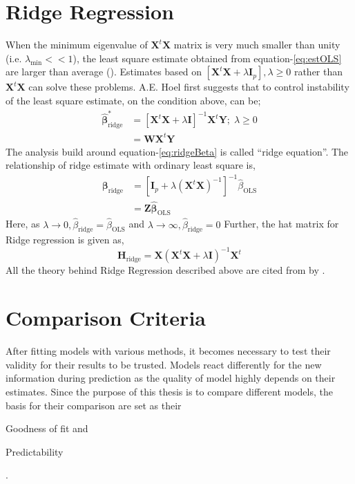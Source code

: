 \documentclass[12pt, lot, lof]{thesis}\usepackage[]{graphicx}\usepackage[]{color}
\newcommand{\bs}[1]{\ensuremath{\boldsymbol{#1}}}
\begin{document}
\section{Ridge Regression}
\label{sec:ridgeRegression}
When the minimum eigenvalue of $\bs{X}^t\bs{X}$ matrix is very much smaller than unity (i.e. $\lambda_\text{min}<<1$), the least square estimate obtained from equation-\ref{eq:estOLS} are larger than average (\cite{marquardt1975ridge}).
Estimates based on $\left[\bs{X}^t\bs{X}+\lambda\bs{I}_p\right], \lambda \ge 0$ rather than $\bs{X}^t\bs{X}$ can solve these problems. A.E. Hoel first suggests that to control instability of the least square estimate, on the condition above, can be;
\begin{align}
\hat{\bs{\beta}}^*_\text{ridge}&=\left[\bs{X}^t\bs{X}+\lambda\bs{I}\right]^{-1}\bs{X}^t\bs{Y};\; \lambda \ge 0 \nonumber\\
&=\bs{WX}^t\bs{Y}
\label{eq:ridgeBeta}
\end{align}
The analysis build around equation-\ref{eq:ridgeBeta} is called ``ridge equation''. The relationship of ridge estimate with ordinary least square is,
\begin{align}
\bs{\beta}_\text{ridge}&=\left[\bs{I}_p+\lambda\left(\bs{X}^t\bs{X}\right)^{-1}\right]^{-1}\hat{\beta}_\text{OLS} \nonumber \\
&=\bs{Z}\hat{\bs{\beta}}_\text{OLS}
\end{align}
Here, as $\lambda \rightarrow 0, \hat{\beta}_\text{ridge}=\hat{\beta}_\text{OLS}$ and $\lambda\rightarrow \infty, \hat{\beta}_\text{ridge}=0$
Further, the hat matrix for Ridge regression is given as,
\begin{equation}
\bs{H}_\text{ridge}=\bs{X}\left(\bs{X}^t\bs{X}+\lambda\bs{I}\right)^{-1}\bs{X}^t
\end{equation}
All the theory behind Ridge Regression described above are cited from  by \citet{hoerl1970ridge}.

\section{Comparison Criteria}
\label{sec:compCriteria}
After fitting models with various methods, it becomes necessary to test their validity for their results to be trusted. Models react differently for the new information during prediction as the quality of model highly depends on their estimates. Since the purpose of this thesis is to compare different models, the basis for their comparison are set as their \begin{inlinelist}\item Goodness of fit and \item Predictability \end{inlinelist}.
\end{document}
